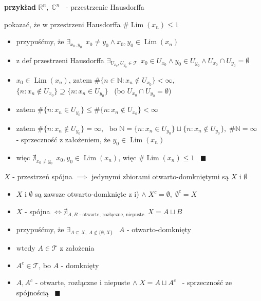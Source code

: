 \documentclass[a4paper,12pt]{article}
\begin{document}
\bigskip
\begin{logbox}
\textbf{przykład} \; \(\mathbb{R}^n, \; \mathbb{C}^n\) \, - przestrzenie Hausdorffa
\end{logbox}

\bigskip
\zdc \; pokazać, że w przestrzeni Hausdorffa \(\#\operatorname{Lim}(x_n) \leq 1\)
\smallskip
\begin{itemize}
    \item przypuśćmy, że \(\exists_{x_0, y_0} \;\, x_0 \neq y_0 \land x_0, y_0 \in \operatorname{Lim}(x_n)\)
    \item z def przestrzeni Hausdorffa \(\exists_{U_{x_0}, U_{y_0} \in \mathcal{T}} \;\, x_0 \in U_{x_0} \land y_0 \in U_{y_0} \land U_{x_0} \cap U_{y_0} = \emptyset\)
    \item \(x_0 \in \operatorname{Lim}(x_n)\), zatem \(\#\{n \in \mathbb{N} : x_n \notin U_{x_0}\} < \infty\), \; \(\{n : x_n \notin U_{x_0}\} \supseteq \{n : x_n \in U_{y_0}\}\) \, (bo \(U_{x_0} \cap U_{y_0} = \emptyset\))
    \item zatem \(\#\{n : x_n \in U_{y_0}\} \leq \#\{n : x_n \notin U_{x_0}\} < \infty\)
    \item zatem \(\#\{n : x_n \notin U_{y_0}\} = \infty\), \, bo \(\mathbb{N} = \{n : x_n \in U_{y_0}\} \sqcup \{n : x_n \notin U_{y_0}\}, \; \#\mathbb{N} = \infty\) \, - sprzeczność z założeniem, że \(y_0 \in \operatorname{Lim}(x_n)\)
    \item więc \(\nexists_{x_0 \neq y_0} \;\, x_0, y_0 \in \operatorname{Lim}(x_n)\), więc \(\#\operatorname{Lim}(x_n) \leq 1\) \, \(\blacksquare\)
\end{itemize}

\bigskip
\zdc \; \(X\) - przestrzeń spójna \(\implies\) jedynymi zbiorami otwarto-domkniętymi są \(X\) i \(\emptyset\)
\begin{itemize}
    \item \(X\) i \(\emptyset\) są zawsze otwarto-domknięte z i) \(\land \; X^c = \emptyset, \; \emptyset^c = X\)
    \item \(X\) - spójna \(\iff \nexists_{A, B \text{ - otwarte, rozłączne, niepuste}} \;\, X = A \sqcup B\)
    \item przypuśćmy, że \(\exists_{A \subseteq X, \; A \notin \{\emptyset, X\}}\) \, \(A\) - otwarto-domknięty
    \item wtedy \(A \in \mathcal{T}\) z założenia
    \item \(A^c \in \mathcal{T}\), bo \(A\) - domknięty
    \item \(A, A^c\) - otwarte, rozłączne i niepuste \(\land \; X = A \sqcup A^c\) \, - sprzeczność ze spójnością \, \(\blacksquare\)
\end{itemize}
\end{document}
